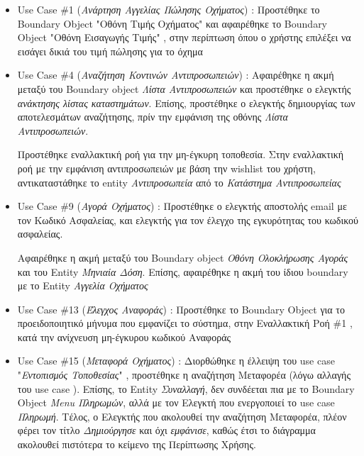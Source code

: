 \documentclass{../ol-softwaremanual}
\begin{document}
	\begin{itemize}
		
		\item \en Use Case \en \#1 (\gr \textit{Ανάρτηση Αγγελίας Πώλησης Οχήματος}) : Προστέθηκε το \en Boundary Object "\gr Οθόνη Τιμής Οχήματος\en" \gr και αφαιρέθηκε το \en Boundary Object "\gr Οθόνη Εισαγωγής Τιμής\en" \gr, στην περίπτωση όπου ο χρήστης επιλέξει να εισάγει δικιά του τιμή πώλησης για το όχημα
		
		\item \en Use Case \en \#4 (\gr \textit{Αναζήτηση Κοντινών Αντιπροσωπειών}) : Αφαιρέθηκε η ακμή μεταξύ του \en Boundary object \gr \textit{Λίστα Αντιπροσωπειών} και προστέθηκε ο ελεγκτής \textit{ανάκτησης λίστας καταστημάτων}. Επίσης, προστέθηκε ο ελεγκτής δημιουργίας των αποτελεσμάτων αναζήτησης, πρίν την εμφάνιση της οθόνης \textit{Λίστα Αντιπροσωπειών}. 
		
		Προστέθηκε εναλλακτική ροή για την μη-έγκυρη τοποθεσία. Στην εναλλακτική ροή με την εμφάνιση αντιπροσωπειών με βάση την \en wishlist \gr του χρήστη, αντικαταστάθηκε το \en entity \gr \textit{Αντιπροσωπεία} από το \textit{Κατάστημα Αντιπροσωπείας}
		
		\item \en Use Case \en \#9 (\gr \textit{Αγορά Οχήματος}) :
		Προστέθηκε ο ελεγκτής αποστολής \en email \gr με τον Κωδικό Ασφαλείας, και ελεγκτής για τον έλεγχο της εγκυρότητας του κωδικού ασφαλείας.
		
		Αφαιρέθηκε η ακμή μεταξύ του \en Boundary object \gr \textit{Οθόνη Ολοκλήρωσης Αγοράς} και του \en Entity \gr \textit{Μηνιαία Δόση}. Επίσης, αφαιρέθηκε η ακμή του ίδιου \en boundary \gr με το \en Entity \gr \textit{Αγγελία Οχήματος}
		
		\item \en Use Case \en \#13 (\gr \textit{Έλεγχος Αναφοράς}) : Προστέθηκε το \en Boundary Object \gr για το προειδοποιητικό μήνυμα που εμφανίζει το σύστημα, στην Εναλλακτική Ροή \en \#1 \gr, κατά την ανίχνευση μη-έγκυρου κωδικού Αναφοράς

		\item \en Use Case \en \#15 (\gr \textit{Μεταφορά Οχήματος}) : Διορθώθηκε η έλλειψη του \en use case \gr \en"\gr\textit{Εντοπισμός Τοποθεσίας}\en" \gr, προστέθηκε η αναζήτηση Μεταφορέα (λόγω αλλαγής του \en use case \gr). Επίσης, το \en Entity \gr \textit{Συναλλαγή}, δεν συνδέεται πια με το \en Boundary Object \gr \textit{\en Menu \gr Πληρωμών}, αλλά με τον Ελεγκτή που ενεργοποιεί το \en use case \gr \textit{Πληρωμή}. Τέλος, ο Ελεγκτής που ακολουθεί την αναζήτηση Μεταφορέα, πλέον φέρει τον τίτλο \textit{Δημιούργησε} και όχι \textit{εμφάνισε}, καθώς έτσι το διάγραμμα ακολουθεί πιστότερα το κείμενο της Περίπτωσης Χρήσης.
		
	\end{itemize}
	
\end{document}
